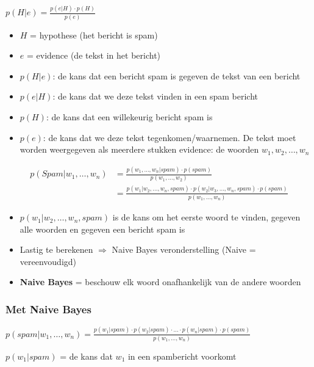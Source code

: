 \documentclass{article}
\begin{document}
\begin{center}
    $p(H|e) = \frac{p(e|H) \cdot p(H)}{p(e)}$
\end{center}

\begin{itemize}
    \item $H$ = hypothese (het bericht is spam)
    \item $e$ = evidence (de tekst in het bericht)
    \item $p(H|e)$: de kans dat een bericht spam is gegeven de tekst van een bericht
    \item $p(e|H)$: de kans dat we deze tekst vinden in een spam bericht
    \item $p(H)$: de kans dat een willekeurig bericht spam is
    \item $p(e)$: de kans dat we deze tekst tegenkomen/waarnemen. De tekst moet worden weergegeven als meerdere stukken evidence: de woorden $w_1, w_2, \dots, w_n$
\end{itemize}


\begin{align*}
    p(Spam | w_1, \dots, w_n) & = \frac{p(w_1, \dots, w_n | spam) \cdot p(spam)}{p(w_1, \dots, w_2)}\\
    & = \frac{p(w_1 | w_2, \dots, w_n, spam) \cdot p(w_2 | w_3, \dots, w_n, spam) \cdot p(spam)}{p(w_1, \dots, w_n)}
\end{align*}

\begin{itemize}
    \item $p(w_1 | w_2, \dots, w_n, spam)$ is de kans om het eerste woord te vinden, gegeven alle woorden en gegeven een bericht spam is
    \item Lastig te berekenen $\Rightarrow$ Naive Bayes veronderstelling (Naive = vereenvoudigd)
    \item \textbf{Naive Bayes} = beschouw elk woord onafhankelijk van de andere woorden
\end{itemize}

\subsubsection{Met Naive Bayes}

\begin{center}
    $p(spam | w_1, \dots, w_n) = \frac{p(w_1 | spam) \cdot p(w_2 | spam) \cdot \dots \cdot p(w_n | spam) \cdot p(spam)}{p(w_1, \dots, w_n)}$
\end{center}

$p(w_1 | spam)$ = de kans dat $w_1$ in een spambericht voorkomt
\end{document}
